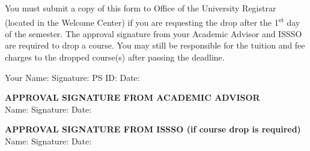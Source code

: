 \documentclass[11pt]{article}
\begin{document}
\vspace{0.5cm}
\noindent You must submit a copy of this form to Office of the University Registrar (located in the Welcome Center) if you are requesting the drop after the 1\textsuperscript{st} day of the semester. The approval signature from your Academic Advisor and ISSSO are required to drop a course. You may still be responsible for the tuition and fee charges to the dropped course(s) after passing the deadline.

\vspace{0.5cm}
\noindent Your Name: \underline{\hspace{3cm}} Signature: \underline{\hspace{3cm}} PS ID: \underline{\hspace{2cm}} Date: \underline{\hspace{2cm}}

\vspace{0.5cm}
\noindent \textbf{APPROVAL SIGNATURE FROM ACADEMIC ADVISOR}\\
Name: \underline{\hspace{3cm}} Signature: \underline{\hspace{3cm}} Date: \underline{\hspace{2cm}}

\vspace{0.5cm}
\noindent \textbf{APPROVAL SIGNATURE FROM ISSSO (if course drop is required)}\\
Name: \underline{\hspace{3cm}} Signature: \underline{\hspace{3cm}} Date: \underline{\hspace{2cm}}
\end{document}
